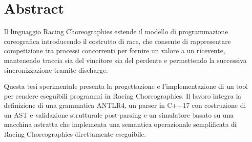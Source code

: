 \chapter*{Abstract}

Il linguaggio Racing Choreographies estende il modello di programmazione coreografica introducendo il costrutto di race, che consente di rappresentare competizione tra processi concorrenti per fornire un valore a un ricevente, mantenendo traccia sia del vincitore sia del perdente e permettendo la successiva sincronizzazione tramite discharge.

Questa tesi sperimentale presenta la progettazione e l’implementazione di un tool per rendere eseguibili programmi in Racing Choreographies. Il lavoro integra la definizione di una grammatica ANTLR4, un parser in C++17 con costruzione di un AST e validazione strutturale post-parsing e un simulatore basato su una macchina astratta che implementa una semantica operazionale semplificata di Racing Choreographies direttamente eseguibile.


